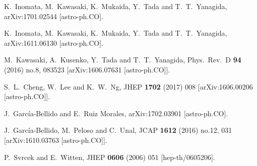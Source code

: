 \begin{thebibliography}{10}
  K.~Inomata, M.~Kawasaki, K.~Mukaida, Y.~Tada and T.~T.~Yanagida,
  arXiv:1701.02544 [astro-ph.CO].


  K.~Inomata, M.~Kawasaki, K.~Mukaida, Y.~Tada and T.~T.~Yanagida,
  arXiv:1611.06130 [astro-ph.CO].


  M.~Kawasaki, A.~Kusenko, Y.~Tada and T.~T.~Yanagida,
  Phys.\ Rev.\ D {\bf 94} (2016) no.8,  083523
  [arXiv:1606.07631 [astro-ph.CO]].

  S.~L.~Cheng, W.~Lee and K.~W.~Ng,
  JHEP {\bf 1702} (2017) 008
  [arXiv:1606.00206 [astro-ph.CO]].


  J.~García-Bellido and E.~Ruiz Morales,
  arXiv:1702.03901 [astro-ph.CO].


  J.~García-Bellido, M.~Peloso and C.~Unal,
  JCAP {\bf 1612} (2016) no.12,  031
  [arXiv:1610.03763 [astro-ph.CO]].


  P.~Svrcek and E.~Witten,
  JHEP {\bf 0606} (2006) 051
  [hep-th/0605206].


\end{thebibliography}
